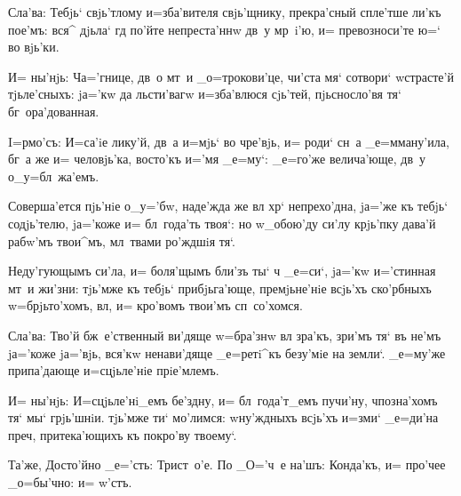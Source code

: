 Сла'ва: Тебjь` свjь'тлому и=зба'вителя свjь'щнику, 
прекра'сный спле'тше ли'къ пое'мъ: вся^ дjьла` гд 
по'йте непреста'ннw дв~у мр~i'ю, и= превозноси'те ю=` во 
вjь'ки.

И= ны'нjь: Ч а='гнице, дв~о мт~и _о=трокови'це, 
чи'ста мя` сотвори` w\т страсте'й тjьле'сныхъ: jа='кw да 
льсти'вагw и=зба'влюся сjь'тей, пjьсносло'вя тя` 
бг~ора'дованная.


I=рмо'съ: И=са'iе лику'й, дв~а и=мjь` во чре'вjь, и= 
роди` сн~а _е=мману'ила, бг~а же и= человjь'ка, восто'къ 
и='мя _е=му`: _е=го'же велича'юще, дв~у о_у=бл~жа'емъ.

Соверша'ется пjь'нiе о_у='бw, наде'жда же вл 
хр` непрехо'дна, jа='же къ тебjь` содjь'телю, 
jа='коже и= бл~года'ть твоя`: но w\т_обою'ду си'лу 
крjь'пку дава'й рабw'мъ твои^мъ, мл~твами ро'ждшiя тя`.

Неду'гующымъ си'ла, и= боля'щымъ бли'зъ ты` ч 
_е=си`, jа='кw и='стинная мт~и жи'зни: тjь'мже къ тебjь` 
прибjьга'юще, премjьне'нiе всjь'хъ ско'рбныхъ 
w=брjьто'хомъ, вл, и= кро'вомъ твои'мъ сп~со'хомся.

Сла'ва: Тво'й бж~е'ственный ви'дяще w=бра'знw вл 
зра'къ, зри'мъ тя` въ не'мъ jа='коже jа='вjь, вся'кw 
ненави'дяще _е=ретi^къ безу'мiе на земли`. _е=му'же 
припа'дающе и=сцjьле'нiе прiе'млемъ.

И= ны'нjь: И=сцjьле'нi_емъ бе'здну, и= бл~года'т_емъ 
пучи'ну, ч позна'хомъ тя` мы` грjь'шнiи. тjь'мже ти` 
мо'лимся: w\т ну'ждныхъ всjь'хъ и=зми` _е=ди'на 
преч, притека'ющихъ къ покро'ву твоему`.

Та'же, Досто'йно _е='сть: Трист~о'е. По _О='ч~е на'шъ: 
Конда'къ, и= про'чее _о=бы'чно: и= w'стъ.
